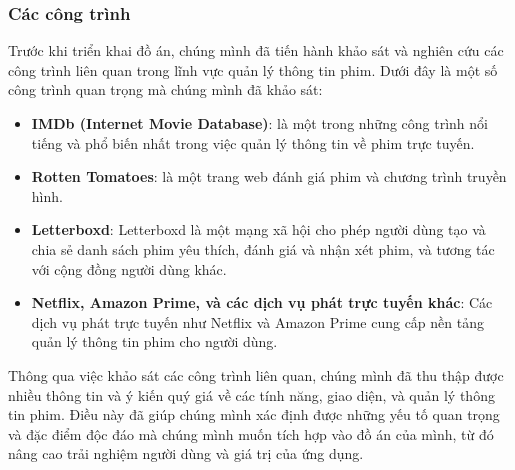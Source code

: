\documentclass[12pt]{article}
\begin{document}
\subsubsection{Các công trình}
Trước khi triển khai đồ án, chúng mình đã tiến hành khảo sát và nghiên cứu các công trình liên quan trong lĩnh vực quản lý thông tin phim. Dưới đây là một số công trình quan trọng mà chúng mình đã khảo sát:
\begin{itemize}
    \item \textbf{IMDb (Internet Movie Database)}: là một trong những công trình nổi tiếng và phổ biến nhất trong việc quản lý thông tin về phim trực tuyến. 
    \item \textbf{Rotten Tomatoes}: là một trang web đánh giá phim và chương trình truyền hình.
    \item \textbf{Letterboxd}: Letterboxd là một mạng xã hội cho phép người dùng tạo và chia sẻ danh sách phim yêu thích, đánh giá và nhận xét phim, và tương tác với cộng đồng người dùng khác.
    \item \textbf{Netflix, Amazon Prime, và các dịch vụ phát trực tuyến khác}: Các dịch vụ phát trực tuyến như Netflix và Amazon Prime cung cấp nền tảng quản lý thông tin phim cho người dùng. 
\end{itemize}
Thông qua việc khảo sát các công trình liên quan, chúng mình đã thu thập được nhiều thông tin và ý kiến quý giá về các tính năng, giao diện, và quản lý thông tin phim. Điều này đã giúp chúng mình xác định được những yếu tố quan trọng và đặc điểm độc đáo mà chúng mình muốn tích hợp vào đồ án của mình, từ đó nâng cao trải nghiệm người dùng và giá trị của ứng dụng.
\end{document}
